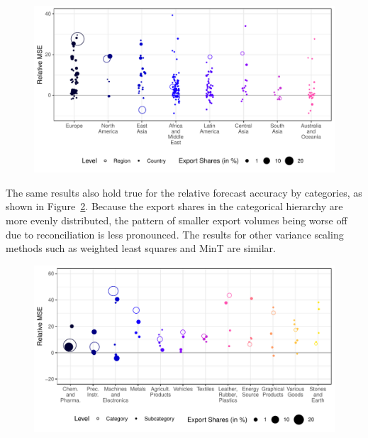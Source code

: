 \documentclass[a4paper,fleqn,11pt]{article}
\begin{document}
\begin{figure}[H]
	\includegraphics[width=\textwidth]{fig/fig_eval_regions}
	\label{fig:eval_regions}
\end{figure}

The same results also hold true for the relative forecast accuracy by categories, as shown in Figure~\ref{fig:eval_categories}. Because the export shares in the categorical hierarchy are more evenly distributed, the pattern of smaller export volumes being worse off due to reconciliation is less pronounced. The results for other variance scaling methods such as weighted least squares and MinT are similar.

\begin{figure}[H]
	\includegraphics[width=\textwidth]{fig/fig_eval_categories}
	\label{fig:eval_categories}
\end{figure}
\end{document}

